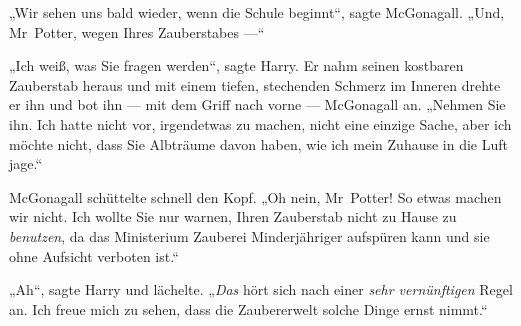 „Wir sehen uns bald wieder, wenn die Schule beginnt“, sagte McGonagall.
„Und, Mr~Potter, wegen Ihres Zauberstabes —“

„Ich weiß, was Sie fragen werden“, sagte Harry. Er nahm seinen kostbaren Zauberstab heraus und mit einem tiefen, stechenden Schmerz im Inneren drehte er ihn und bot ihn — mit dem Griff nach vorne — McGonagall an.
„Nehmen Sie ihn. Ich hatte nicht vor, irgendetwas zu machen, nicht eine einzige Sache, aber ich möchte nicht, dass Sie Albträume davon haben, wie ich mein Zuhause in die Luft jage.“

McGonagall schüttelte schnell den Kopf.
„Oh nein, Mr~Potter! So etwas machen wir nicht. Ich wollte Sie nur warnen, Ihren Zauberstab nicht zu Hause zu \emph{benutzen}, da das Ministerium Zauberei Minderjähriger aufspüren kann und sie ohne Aufsicht verboten ist.“

„Ah“, sagte Harry und lächelte.
„\emph{Das} hört sich nach einer \emph{sehr vernünftigen} Regel an. Ich freue mich zu sehen, dass die Zaubererwelt solche Dinge ernst nimmt.“


